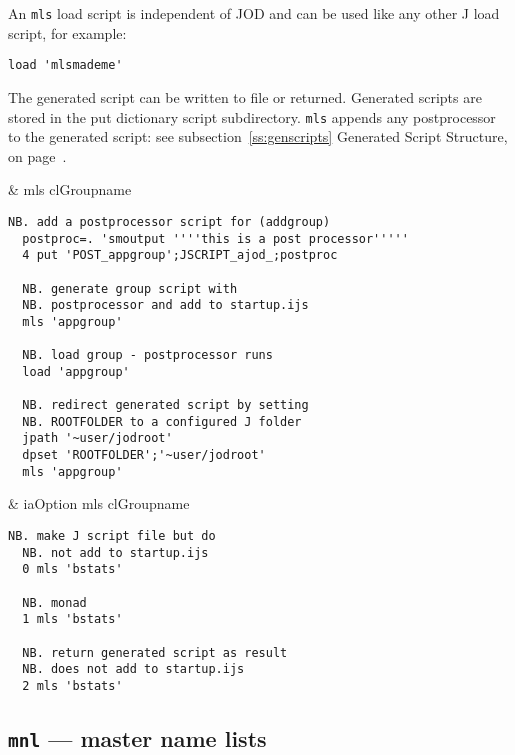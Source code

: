 An \verb|mls| load script is independent of JOD and can be used 
like any other J load script, for example:

\begin{lstlisting}[frame=single,framerule=0pt]
  load 'mlsmademe'
\end{lstlisting}

The generated script can be written to file or returned. 
Generated scripts are stored in the put dictionary script subdirectory.  
\texttt{mls} appends any postprocessor to the generated script: 
see subsection~\ref{ss:genscripts} Generated Script Structure, on page~\pageref{ss:genscripts}.

\begin{wordhead}
\monad & mls clGroupname \\
\end{wordhead}
\begin{lstlisting}[frame=single,framerule=0pt] 
  NB. add a postprocessor script for (addgroup) 
  postproc=. 'smoutput ''''this is a post processor'''''
  4 put 'POST_appgroup';JSCRIPT_ajod_;postproc  

  NB. generate group script with 
  NB. postprocessor and add to startup.ijs
  mls 'appgroup' 
  
  NB. load group - postprocessor runs
  load 'appgroup'
  
  NB. redirect generated script by setting 
  NB. ROOTFOLDER to a configured J folder 
  jpath '~user/jodroot' 
  dpset 'ROOTFOLDER';'~user/jodroot'
  mls 'appgroup'
\end{lstlisting}

\begin{wordhead}
\dyad & iaOption mls clGroupname \\
\end{wordhead}
\begin{lstlisting}[frame=single,framerule=0pt] 
  NB. make J script file but do 
  NB. not add to startup.ijs
  0 mls 'bstats' 

  NB. monad 
  1 mls 'bstats' 

  NB. return generated script as result 
  NB. does not add to startup.ijs  
  2 mls 'bstats' 
\end{lstlisting}

\subsection{\texttt{mnl} --- master name lists}\label{ss:mnl}

